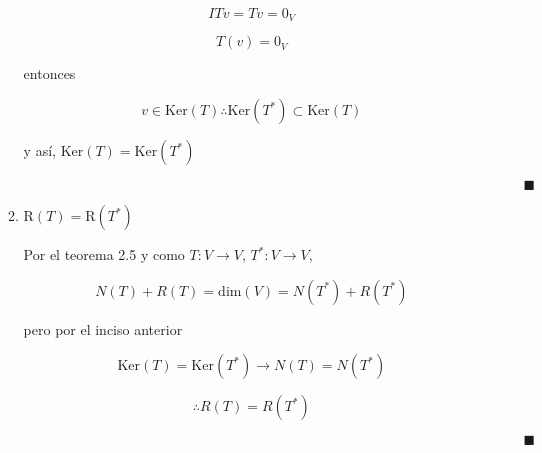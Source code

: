 \documentclass[12pt,a4paper]{article}
\begin{document}
\begin{enumerate}
\begin{enumerate}
        \begin{equation*}
            ITv = Tv = 0_V
        \end{equation*}
        
        \begin{equation*}
            T(v)= 0_V
        \end{equation*}

        entonces
        
        \begin{equation*}
            v \in \text{Ker}(T) \therefore \text{Ker}(T^{*}) \subset \text{Ker}(T)
        \end{equation*}
        
        y así, $\text{Ker}(T) = \text{Ker}(T^{*})$ 
        
        $\hspace{15cm} \blacksquare$
        
        
        
        \item $\text{R}(T) = \text{R}(T^{*})$
        
        Por el teorema 2.5 y como $T:V \rightarrow V$, $T^{*}:V \rightarrow V$, 
        
        \begin{equation*}
            N(T) + R(T) = \text{dim}(V) = N(T^{*})+R(T^{*})
        \end{equation*}
        
        pero por el inciso anterior
        
        \begin{equation*}
            \text{Ker}(T)= \text{Ker}(T^{*}) \rightarrow N(T)= N(T^{*})
        \end{equation*}
        
        \begin{equation*}
            \therefore R(T)= R(T^{*})
        \end{equation*}
        
        $\hspace{15cm} \blacksquare$
        
        
    \end{enumerate}
\end{enumerate}
\end{document}
